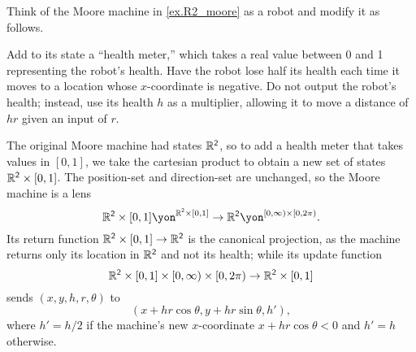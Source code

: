\documentclass[Book-Poly]{subfiles}
\begin{document}
\begin{exercise}
Think of the Moore machine in \cref{ex.R2_moore} as a robot and modify it as follows.

Add to its state a ``health meter,'' which takes a real value between 0 and 1 representing the robot's health.
Have the robot lose half its health each time it moves to a location whose $x$-coordinate is negative.
Do not output the robot's health; instead, use its health $h$ as a multiplier, allowing it to move a distance of $hr$ given an input of $r$.
\begin{solution}
The original Moore machine had states $\mathbb{R}^{\textsf{2}}$, so to add a health meter that takes values in $[0,1]$, we take the cartesian product to obtain a new set of states $\mathbb{R}^{\textsf{2}}\times[0,1]$.
The position-set and direction-set are unchanged, so the Moore machine is a lens
\[
    \rr^\2\times[0,1]\yon^{\rr^\2\times[0,1]} \to \rr^\2\yon^{[0,\infty)\times[0,2\pi)}.
\]
Its return function $\mathbb{R}^{\textsf{2}}\times[0,1]\to\mathbb{R}^{\textsf{2}}$ is the canonical projection, as the machine returns only its location in $\mathbb{R}^{\textsf{2}}$ and not its health; while its update function
\[
    \mathbb{R}^{\textsf{2}} \times [0,1] \times [0,\infty) \times [0,2\pi) \to \mathbb{R}^{\textsf{2}} \times [0,1]
\]
sends $(x, y, h, r, \theta)$ to
\[
    (x + hr\cos\theta, y + hr\sin\theta, h'),
\]
where $h' = h/2$ if the machine's new $x$-coordinate $x + hr\cos\theta < 0$ and $h' = h$ otherwise.
\end{solution}
\end{exercise}
\end{document}

